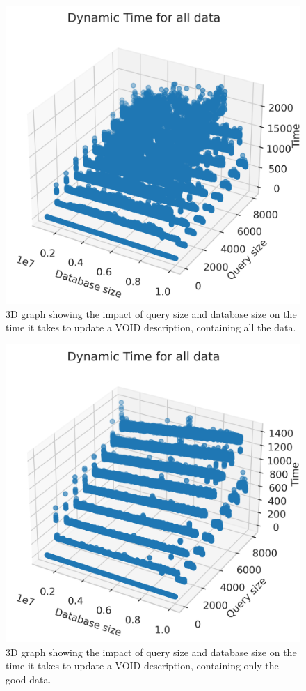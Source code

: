 \begin{figure}
    \centering
    \includegraphics[width=0.8\columnwidth]{figures/dynamic-time-for-all.png}
    \caption{3D graph showing the impact of query size and database size on the time it takes to update a VOID description, containing all the data.}
    \label{fig:update-querysize-dbsize-all}
\end{figure}

\begin{figure}
    \centering
    \includegraphics[width=0.8\columnwidth]{figures/dynamic-time-for-all-good.png}
    \caption{3D graph showing the impact of query size and database size on the time it takes to update a VOID description, containing only the good data.}
    \label{fig:update-querysize-dbsize-good}
\end{figure}

